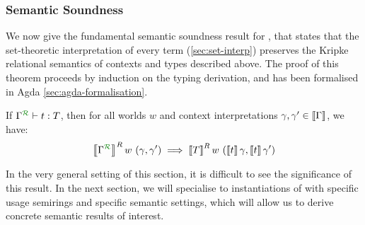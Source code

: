 \subsubsection{Semantic Soundness}

We now give the fundamental semantic soundness result for \name{},
that states that the set-theoretic interpretation of every term
(\autoref{sec:set-interp}) preserves the Kripke relational semantics
of contexts and types described above. The proof of this theorem
proceeds by induction on the typing derivation, and has been
formalised in Agda \autoref{sec:agda-formalisation}.

\begin{theorem}
  If $\ctx{\Gamma}{R} \vdash t : T$, then for all worlds $w$ and
  context interpretations $\gamma, \gamma' \in \left\llbracket \Gamma \right\rrbracket$, we have:
  \begin{displaymath}
    \sem{\ctx{\Gamma}{R}}^R w~(\gamma, \gamma') \implies \sem{T}^R w~(\sem{t}\gamma, \sem{t}\gamma')
  \end{displaymath}
\end{theorem}

In the very general setting of this section, it is difficult to see
the significance of this result. In the next section, we will
specialise to instantiations of \name{} with specific usage
semirings and specific semantic settings, which will allow us to
derive concrete semantic results of interest.


